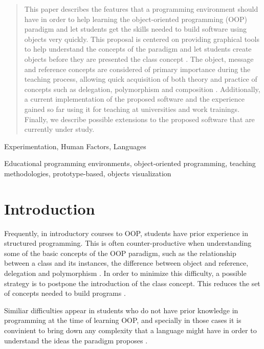 \documentclass{sigplanconf}
\begin{document}
\begin{abstract}
This paper describes the features that a programming environment should have in order to help learning the object-oriented programming (OOP) paradigm and let students get the skills needed to build software using objects very quickly. This proposal is centered on providing graphical tools to help understand the concepts of the paradigm and let students create objects before they are presented the class concept \cite{Utti10}. The object, message and reference concepts are considered of primary importance during the teaching process, allowing quick acquisition of both theory and practice of concepts such as delegation, polymorphism and composition \cite{Lomb07}.
Additionally, a current implementation of the proposed software and the experience gained so far using it for teaching at universities and work trainings. Finally, we describe possible extensions to the proposed software that are currently under study.
\end{abstract}


\terms
Experimentation, Human Factors, Languages

\keywords
Educational programming environments, object-oriented programming, teaching methodologies, prototype-based, objects visualization

\section{Introduction}

Frequently, in introductory courses to OOP, students have prior experience in structured programming. 
This is often counter-productive when understanding some of the basic concepts of the OOP paradigm, such as the relationship between a class and its instances, the difference between object and reference, delegation and polymorphism \cite{Weir05}. In order to minimize this difficulty, a possible strategy is to postpone the introduction of the class concept. This reduces the set of concepts needed to build programs \cite{Lomb07}. 

Similiar difficulties appear in students who do not have prior knowledge in programming at the time of learning OOP, and specially in those cases it is convinient to bring down any complexity that a language might have in order to understand the ideas the paradigm proposes \cite{Vent04}.
\end{document}
